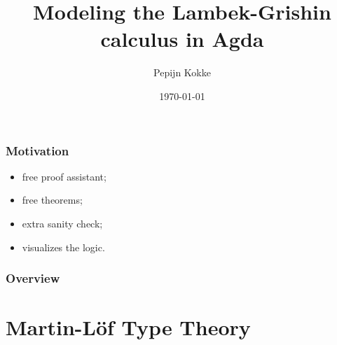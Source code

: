 \documentclass[utf8x]{beamer}
\title[Lambek-Grishin in Agda]{Modeling the Lambek-Grishin calculus in Agda}
\author{Pepijn Kokke}
\institute[UU]{Utrecht University}
\date{\today}
\begin{document}
\begin{frame}
\titlepage%
\end{frame}

\begin{frame}
\frametitle{Motivation}

\begin{itemize}
\item free proof assistant;
\item free theorems;
\item extra sanity check;
\item visualizes the logic.
\end{itemize}
\end{frame}

\begin{frame}
\frametitle{Overview}
\tableofcontents
\end{frame}



\section{Martin-Löf Type Theory}
\end{document}
